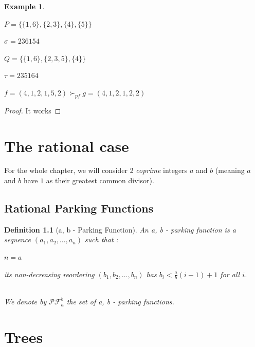 \documentclass[12pt]{report}
\newtheorem{definition}{Definition}
\newtheorem*{example}{Example}
\begin{document}
\begin{example}
    \text{}\\
    \begin{itemize*}
        \item $P = \{\{1, 6\}, \{2, 3\}, \{4\}, \{5\}\}$\\
        \item $\sigma = 236154$\\
        \item $Q = \{\{1, 6\}, \{2, 3, 5\}, \{4\}\}$\\
        \item $\tau = 235164$\\
        \item $f = (4, 1, 2, 1, 5, 2) \succ_{pf}
            g = (4, 1, 2, 1, 2, 2)$\\
    \end{itemize*}
\end{example}

\begin{proof}
    It works
\end{proof}

\chapter{The rational case}

For the whole chapter, we will consider 2 \emph{coprime}
integers $a$ and $b$ (meaning $a$ and $b$ have $1$ as their
greatest common divisor).

\section{Rational Parking Functions}

\begin{definition}[a, b - Parking Function]
    An \emph{a, b - parking function} is a sequence 
    $(a_1, a_2, \ldots, a_n)$ such that :\\
    \begin{itemize*}
        \item $n = a$\\
        \item its non-decreasing reordering 
        $(b_1, b_2, \ldots, b_n)$
        has $b_i < \frac{a}{b}(i - 1) + 1$ for all $i$.\\\\
    \end{itemize*}
    We denote by $\mathcal{PF}^b_a$ the set of 
    a, b - parking functions.
\end{definition}

\chapter{Trees}
\end{document}

